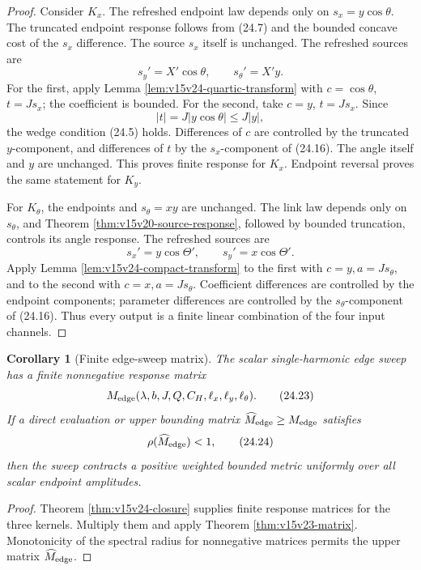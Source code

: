 \documentclass[11pt]{article}
\newtheorem{corollary}[theorem]{Corollary}
\theoremstyle{remark}
\begin{document}
\begin{proof}
Consider \(K_x\).  The refreshed endpoint law depends only on
\(s_x=y\cos\theta\).  The truncated endpoint response follows from
(24.7) and the bounded concave cost of the \(s_x\) difference.
The source \(s_x\) itself is unchanged.  The refreshed sources are
\[
 s_y'=X'\cos\theta,\qquad
 s_\theta'=X'y.                                             \tag{24.21}
\]
For the first, apply Lemma
\ref{lem:v15v24-quartic-transform} with
\(c=\cos\theta\), \(t=Js_x\); the coefficient is bounded.
For the second, take \(c=y\), \(t=Js_x\).  Since
\[
 |t|=J|y\cos\theta|\le J|y|,
\]
the wedge condition (24.5) holds.  Differences of \(c\) are
controlled by the truncated \(y\)-component, and differences of
\(t\) by the \(s_x\)-component of (24.16).  The angle itself and
\(y\) are unchanged.  This proves finite response for \(K_x\).
Endpoint reversal proves the same statement for \(K_y\).

For \(K_\theta\), the endpoints and \(s_\theta=xy\) are unchanged.
The link law depends only on \(s_\theta\), and Theorem
\ref{thm:v15v20-source-response}, followed by bounded truncation,
controls its angle response.  The refreshed sources are
\[
 s_x'=y\cos\Theta',\qquad
 s_y'=x\cos\Theta'.                                        \tag{24.22}
\]
Apply Lemma \ref{lem:v15v24-compact-transform} to the first with
\(c=y,a=Js_\theta\), and to the second with
\(c=x,a=Js_\theta\).  Coefficient differences are controlled by
the endpoint components; parameter differences are controlled by
the \(s_\theta\)-component of (24.16).  Thus every output is a
finite linear combination of the four input channels.
\end{proof}

\begin{corollary}[Finite edge-sweep matrix]
\label{cor:v15v24-matrix}
The scalar single-harmonic edge sweep has a finite nonnegative
response matrix
\[
 M_{\rm edge}(\lambda,b,J,Q,C_H,\ell_x,\ell_y,\ell_\theta).
                                                               \tag{24.23}
\]
If a direct evaluation or upper bounding matrix
\(\widehat M_{\rm edge}\ge M_{\rm edge}\) satisfies
\[
 \rho(\widehat M_{\rm edge})<1,                             \tag{24.24}
\]
then the sweep contracts a positive weighted bounded metric
uniformly over all scalar endpoint amplitudes.
\end{corollary}

\begin{proof}
Theorem \ref{thm:v15v24-closure} supplies finite response matrices
for the three kernels.  Multiply them and apply Theorem
\ref{thm:v15v23-matrix}.  Monotonicity of the spectral radius for
nonnegative matrices permits the upper matrix
\(\widehat M_{\rm edge}\).
\end{proof}
\end{document}
